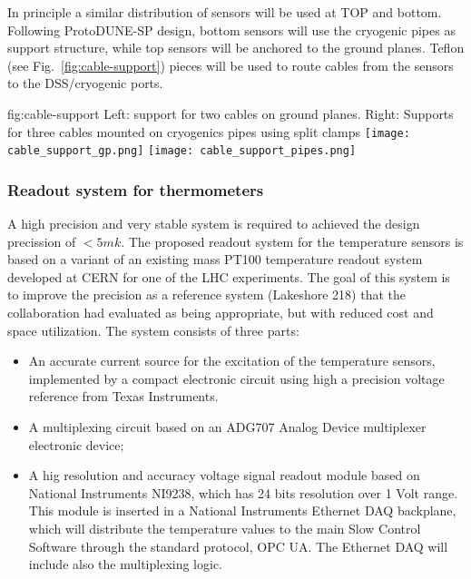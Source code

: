 In principle a similar distribution of sensors will be used at TOP and bottom.
Following ProtoDUNE-SP design, bottom sensors will use the cryogenic pipes as support structure, while top sensors will be anchored to the ground planes.
Teflon (see Fig.~\ref{fig:cable-support}) pieces will be used to route cables from the sensors to the DSS/cryogenic ports.


\begin{dunefigure}{fig:cable-support}
  {Left: support for two cables on ground planes. Right: Supports for three cables  mounted on cryogenics pipes using split clamps}
  \texttt{[image: cable\_support\_gp.png]}
  \texttt{[image: cable\_support\_pipes.png]}
\end{dunefigure}


\subsubsection{Readout system for thermometers}
\label{sec:fdsp-slow-cryo-therm-readout}

A high precision and very stable system is required to achieved the design precission of $< 5 mk$.
The proposed readout system for the temperature sensors is based on a variant of an existing mass PT100 temperature readout system developed at CERN for one of the LHC experiments.
The goal of this system is to improve the precision as a reference system (Lakeshore 218) that the collaboration had evaluated as being appropriate,
but with reduced cost and space utilization.
The system consists of three parts:
\begin{itemize}
\item An accurate current source for the excitation of the temperature sensors, implemented by a compact electronic circuit using high a precision voltage reference from Texas Instruments. 
\item A multiplexing circuit based on an ADG707 Analog Device multiplexer electronic device;
\item A hig resolution and accuracy voltage signal readout module based on National Instruments NI9238, which has 24 bits resolution over 1 Volt range.
  This module is inserted in a National Instruments Ethernet DAQ backplane, which will distribute the temperature values to the main Slow Control Software
  through the standard protocol, OPC UA. The Ethernet DAQ will include also the multiplexing logic.
\end{itemize}

